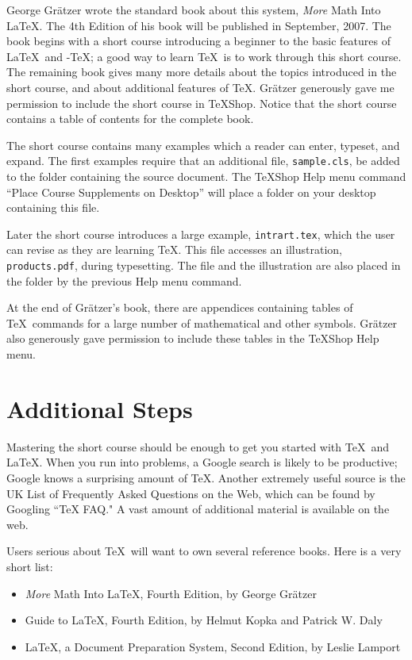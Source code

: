 \documentclass[11pt, oneside]{amsart}
\begin{document}
\begin{multicols}{2}
George Gr\"atzer wrote the standard book about this system, \emph{More} Math Into \LaTeX.  The 4th Edition of his book will be published in September, 2007. The book begins with a  short course introducing a beginner to the basic features of \LaTeX\ and \AmS-\TeX; a good way to learn \TeX\ is to work through this short course. The remaining book gives many more details about the topics introduced in the short course, and about additional features of \TeX. Gr\"atzer generously gave me permission to include the short course in TeXShop. Notice that the short course contains a table of contents for the complete book.

The short course contains many examples which a reader can enter, typeset, and expand. The first examples require that an additional file, {\tt sample.cls}, be added to the folder containing the source document. The TeXShop Help menu command ``Place Course Supplements on Desktop'' will place a folder on your desktop containing this file.

Later the short course introduces a large example, {\tt intrart.tex}, which the user can revise as they are learning \TeX. This file accesses an illustration, {\tt products.pdf}, during typesetting. The file and the illustration are also placed in the folder by the previous Help menu command.

At the end of Gr\"atzer's book, there are appendices containing tables of \TeX\ commands for a large number of mathematical and other symbols. Gr\"atzer also generously gave permission to include these tables in the TeXShop Help menu.

\section{Additional Steps}

Mastering the short course should be enough to get you started with \TeX\ and \LaTeX. When you run into problems, a Google search is likely to be productive; Google knows a surprising amount of \TeX. Another extremely useful source  is the UK List of Frequently Asked Questions on the Web, which can be found by Googling ``TeX FAQ." A vast amount of additional material is available on the web. 

Users serious about \TeX\ will want to own several reference books. Here is a very short list:
\begin{itemize}
\item
\emph{More} Math Into \LaTeX, Fourth Edition, by George Gr\"atzer
\item Guide to \LaTeX, Fourth Edition, by Helmut Kopka and Patrick W. Daly
\item \LaTeX, a Document Preparation System, Second Edition, by Leslie Lamport
\end{itemize}


\end{multicols}
\end{document}
